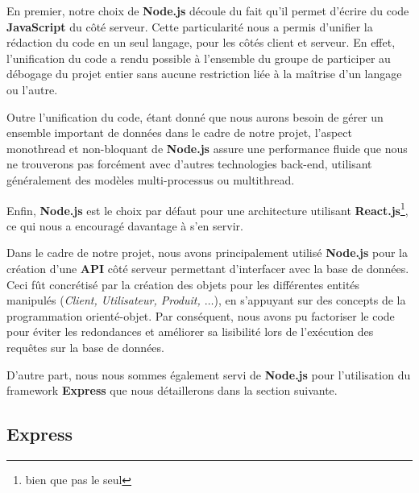 \documentclass[a4paper,12pt]{report}
\theoremstyle{break}
\theoremstyle{break}
\theoremstyle{break}
\theoremstyle{break}
\theoremstyle{definition}
\theoremstyle{remark}
\begin{document}
En premier, notre choix de \textbf{Node.js} découle du fait qu'il permet d'écrire du code \textbf{JavaScript} du côté serveur. Cette particularité nous a permis d'unifier la rédaction du code en un seul langage, pour les côtés client et serveur. En effet, l'unification du code a rendu possible à l'ensemble du groupe de participer au débogage du projet entier sans aucune restriction liée à la maîtrise d'un langage ou l'autre.

Outre l'unification du code, étant donné que nous aurons besoin de gérer un ensemble important de données dans le cadre de notre projet, l'aspect monothread et non-bloquant de \textbf{Node.js} assure une performance fluide que nous ne trouverons pas forcément avec d'autres technologies back-end, utilisant généralement des modèles multi-processus ou multithread.

Enfin, \textbf{Node.js} est le choix par défaut pour une architecture utilisant \textbf{React.js}\footnote{bien que pas le seul}, ce qui nous a encouragé davantage à s'en servir.

Dans le cadre de notre projet, nous avons principalement utilisé \textbf{Node.js} pour la création d'une \textbf{API} côté serveur permettant d'interfacer avec la base de données. Ceci fût concrétisé par la création des objets pour les différentes entités manipulés (\textit{Client, Utilisateur, Produit, $\dots$}), en s'appuyant sur des concepts de la programmation orienté-objet. Par conséquent, nous avons pu factoriser le code pour éviter les redondances et  améliorer sa lisibilité lors de l'exécution des requêtes sur la base de données.

D'autre part, nous nous sommes également servi de \textbf{Node.js} pour l'utilisation du framework \textbf{Express} que nous détaillerons dans la section suivante.
\subsection{Express}
\end{document}
